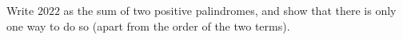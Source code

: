 Write $2022$ as the sum of two positive palindromes, and show that there is only one way to do so (apart from the order of the two terms).

